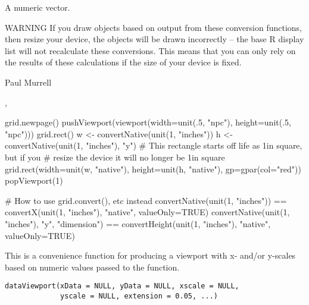 %
\begin{Value}
A numeric vector.
\end{Value}
%
\begin{Section}{WARNING }
 If you draw objects based on output from these conversion
functions, then resize your device, the objects will be drawn 
incorrectly -- the base R display list will not recalculate these
conversions.  This means that you can only rely on the results of 
these calculations if the size of your device is fixed.
\end{Section}
%
\begin{Author}\relax
 Paul Murrell 
\end{Author}
%
\begin{SeeAlso}\relax
 ,  
\end{SeeAlso}
%
\begin{Examples}
\begin{ExampleCode}
grid.newpage()
pushViewport(viewport(width=unit(.5, "npc"),
                       height=unit(.5, "npc")))
grid.rect()
w <- convertNative(unit(1, "inches"))
h <- convertNative(unit(1, "inches"), "y")
# This rectangle starts off life as 1in square, but if you
# resize the device it will no longer be 1in square
grid.rect(width=unit(w, "native"), height=unit(h, "native"),
          gp=gpar(col="red"))
popViewport(1)

# How to use grid.convert(), etc instead
convertNative(unit(1, "inches")) ==
  convertX(unit(1, "inches"), "native", valueOnly=TRUE)
convertNative(unit(1, "inches"), "y", "dimension") ==
  convertHeight(unit(1, "inches"), "native", valueOnly=TRUE)
\end{ExampleCode}
\end{Examples}
%
\begin{Description}\relax
This is a convenience function for producing a viewport with
x- and/or y-scales based on numeric values passed to the function.
\end{Description}
%
\begin{Usage}
\begin{verbatim}
dataViewport(xData = NULL, yData = NULL, xscale = NULL,
             yscale = NULL, extension = 0.05, ...)
\end{verbatim}
\end{Usage}
%
